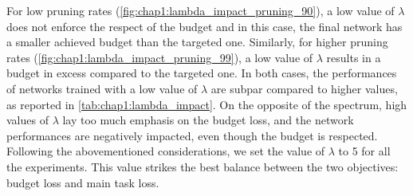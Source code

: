 For low pruning rates (\cref{fig:chap1:lambda_impact_pruning_90}), a low value
of $\lambda$ does not enforce the respect of the budget and in this case, the
final network has a smaller achieved budget than the targeted one. Similarly,
for higher pruning rates (\cref{fig:chap1:lambda_impact_pruning_99}), a low
value of $\lambda$ results in a budget in excess compared to the targeted one.
In both cases, the performances of networks trained with a low value of
$\lambda$ are subpar compared to higher values, as reported in
\cref{tab:chap1:lambda_impact}. On the opposite of the spectrum, high values of
$\lambda$ lay too much emphasis on the budget loss, and the network performances
are negatively impacted, even though the budget is respected. Following the
abovementioned considerations, we set the value of $\lambda$ to 5 for all the
experiments. This value strikes the best balance between the two objectives:
budget loss and main task loss.



